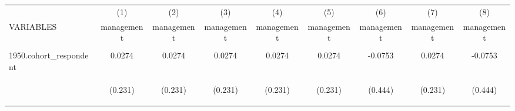 \begin{center}
\begin{tabular}{lcccccccc} \hline
 & (1) & (2) & (3) & (4) & (5) & (6) & (7) & (8) \\
VARIABLES & management & management & management & management & management & management & management & management \\ \hline
\vspace{4pt} & \begin{footnotesize}\end{footnotesize} & \begin{footnotesize}\end{footnotesize} & \begin{footnotesize}\end{footnotesize} & \begin{footnotesize}\end{footnotesize} & \begin{footnotesize}\end{footnotesize} & \begin{footnotesize}\end{footnotesize} & \begin{footnotesize}\end{footnotesize} & \begin{footnotesize}\end{footnotesize} \\
1950.cohort\_respondent & 0.0274 & 0.0274 & 0.0274 & 0.0274 & 0.0274 & -0.0753 & 0.0274 & -0.0753 \\
\vspace{4pt} & \begin{footnotesize}(0.231)\end{footnotesize} & \begin{footnotesize}(0.231)\end{footnotesize} & \begin{footnotesize}(0.231)\end{footnotesize} & \begin{footnotesize}(0.231)\end{footnotesize} & \begin{footnotesize}(0.231)\end{footnotesize} & \begin{footnotesize}(0.444)\end{footnotesize} & \begin{footnotesize}(0.231)\end{footnotesize} & \begin{footnotesize}(0.444)\end{footnotesize} \\

\end{tabular}
\end{center}
